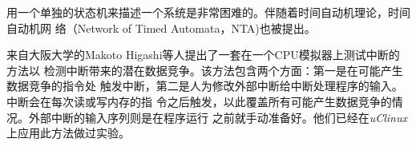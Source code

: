用一个单独的状态机来描述一个系统是非常困难的。伴随着时间自动机理论，时间自动机网
络（Network of Timed Automata，NTA)也被提出。

来自大阪大学的Makoto Higashi等人提出了一套在一个CPU模拟器上测试中断的方法以
检测中断带来的潜在数据竞争。该方法包含两个方面：第一是在可能产生数据竞争的指令处
触发中断，第二是人为修改外部中断给中断处理程序的输入。中断会在每次读或写内存的指
令之后触发，以此覆盖所有可能产生数据竞争的情况。外部中断的输入序列则是在程序运行
之前就手动准备好。他们已经在\emph{uClinux}上应用此方法做过实验。\cite{Higashi:2010:EMC:1808266.1808278}

